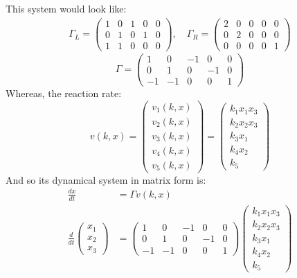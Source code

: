 This system would look like:
\begin{align*}
	\Gamma_L =
	\begin{pmatrix}
		1 & 0 & 1 & 0 & 0 \\
		0 & 1 & 0 & 1 & 0 \\
		1 & 1 & 0 & 0 & 0
	\end{pmatrix}
	, \quad
	\Gamma_R =
	\begin{pmatrix}
		2 & 0 & 0 & 0 & 0 \\
		0 & 2 & 0 & 0 & 0 \\
		0 & 0 & 0 & 0 & 1
	\end{pmatrix}
\end{align*}
\begin{equation*}
 \Gamma =
 \begin{pmatrix*}
		1 & 0 & -1 & 0 & 0 \\
		0 & 1 & 0 & -1 & 0 \\
		-1 & -1 & 0 & 0 & 1
 \end{pmatrix*}
\end{equation*}
Whereas, the reaction rate:
\[
	v(k,x) =
	\begin{pmatrix*}
		v_{1}(k,x)	 \\
		v_{2}(k,x)	 \\
		v_{3}(k,x)	 \\
		v_{4}(k,x)	 \\
		v_{5}(k,x)
	\end{pmatrix*} =
	\begin{pmatrix}
		k_1 x_1 x_3 \\
		k_2 x_2 x_3 \\
		k_3 x_1 \\
		k_4 x_2 \\
		k_5
	\end{pmatrix}
\]
And so its dynamical system in matrix form is:
\begin{align*}
	\frac{dx}{dt} &= \Gamma v(k,x) \\
	\frac{d}{dt}
	\begin{pmatrix*}
		x_1	\\
		x_2	\\
		x_3	
	\end{pmatrix*} &=
	\begin{pmatrix*}
		1 & 0 & -1 & 0 & 0 \\
		0 & 1 & 0 & -1 & 0 \\
		-1 & -1 & 0 & 0 & 1
 \end{pmatrix*}
	\begin{pmatrix}
		k_1 x_1 x_3 \\
		k_2 x_2 x_3 \\
		k_3 x_1 \\
		k_4 x_2 \\
		k_5
	\end{pmatrix}
\end{align*}
